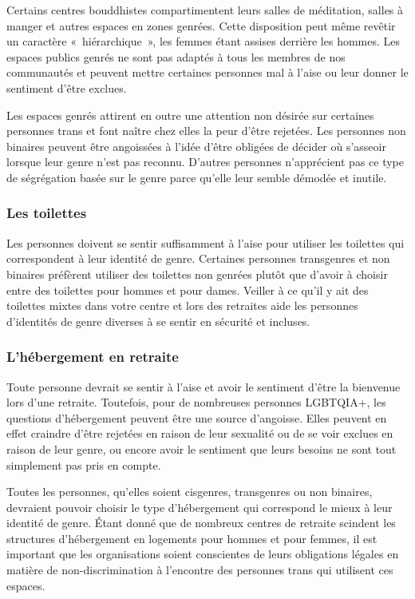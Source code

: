\documentclass[12pt,openany]{book}
\begin{document}
\noindent Certains centres bouddhistes compartimentent leurs salles de méditation, salles à manger et autres espaces en zones genrées. Cette disposition peut même revêtir un caractère \mbox{« hiérarchique »}, les femmes étant assises derrière les hommes. Les espaces publics genrés ne sont pas adaptés à tous les membres de nos communautés et peuvent mettre certaines personnes mal à l’aise ou leur donner le sentiment d’être exclues.

Les espaces genrés attirent en outre une attention non désirée sur certaines personnes trans et font naître chez elles la peur d’être rejetées. Les personnes non binaires peuvent être angoissées à l’idée d’être obligées de décider où s’asseoir lorsque leur genre n’est pas reconnu. D’autres personnes n’apprécient pas ce type de ségrégation basée sur le genre parce qu’elle leur semble démodée et inutile.

\subsubsection*{Les toilettes}

\noindent Les personnes doivent se sentir suffisamment à l’aise pour utiliser les toilettes qui correspondent à leur identité de genre. Certaines personnes transgenres et non binaires préfèrent utiliser des toilettes non genrées plutôt que d’avoir à choisir entre des toilettes pour hommes et pour dames. Veiller à ce qu’il y ait des toilettes mixtes dans votre centre et lors des retraites aide les personnes d’identités de genre diverses à se sentir en sécurité et incluses.

\subsubsection*{L’hébergement en retraite}

\noindent Toute personne devrait se sentir à l’aise et avoir le sentiment d’être la bienvenue lors d’une retraite. Toutefois, pour de nombreuses personnes \mbox{LGBTQIA+}, les questions d’hébergement peuvent être une source d’angoisse. Elles peuvent en effet craindre d’être rejetées en raison de leur sexualité ou de se voir exclues en raison de leur genre, ou encore avoir le sentiment que leurs besoins ne sont tout simplement pas pris en compte.

Toutes les personnes, qu’elles soient cisgenres, transgenres ou non binaires, devraient pouvoir choisir le type d’hébergement qui correspond le mieux à leur identité de genre.
Étant donné que de nombreux centres de retraite scindent les structures d’hébergement en logements pour hommes et pour femmes, il est important que les organisations soient conscientes de leurs obligations légales en matière de non-discrimination à l’encontre des personnes trans qui utilisent ces espaces.
\end{document}
